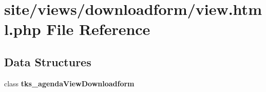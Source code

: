 \section{site/views/downloadform/view.html.\+php File Reference}
\label{site_2views_2downloadform_2view_8html_8php}
\subsection*{Data Structures}
\begin{DoxyCompactItemize}
\item 
class \textbf{ tks\+\_\+agenda\+View\+Downloadform}
\end{DoxyCompactItemize}
